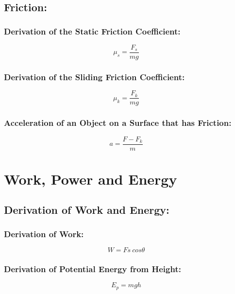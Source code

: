 \documentclass[a4paper]{report}
\begin{document}
   \section{Friction: }
        \subsection{Derivation of the Static Friction Coefficient: }
            \begin{equation}
                \mu_s = \frac{F_s}{mg}
            \end{equation}
        \subsection{Derivation of the Sliding Friction Coefficient: }
            \begin{equation}
                \mu_k = \frac{F_k}{mg}
            \end{equation}
        \subsection{Acceleration of an Object on a Surface that has Friction: }
            \begin{equation}
                a = \frac{F-F_k}{m}
            \end{equation}
   
\chapter{Work, Power and Energy}
    \section{Derivation of Work and Energy: }
        \subsection{Derivation of Work: }
            \begin{equation}
                W = Fs \ cos\theta
            \end{equation}
        \subsection{Derivation of Potential Energy from Height: }
            \begin{equation}
                E_p = mgh
            \end{equation}
\end{document}
